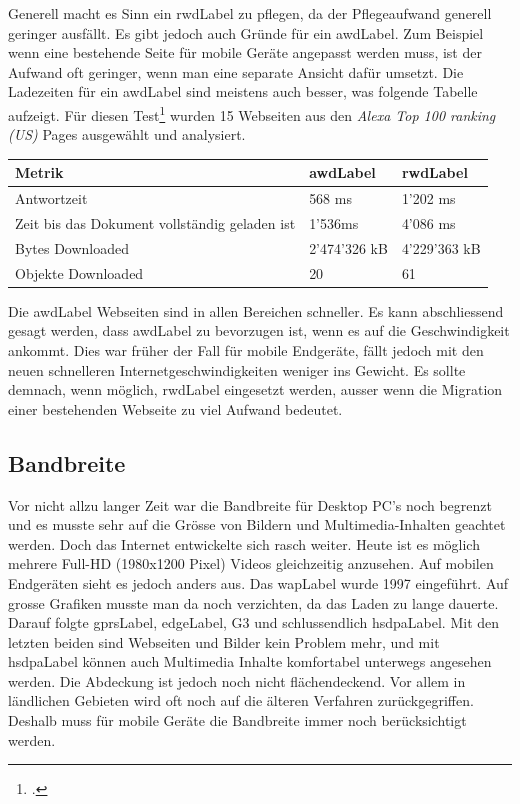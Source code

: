Generell macht es Sinn ein \gls{rwdLabel} zu pflegen, da der Pflegeaufwand generell geringer ausfällt. Es gibt jedoch auch Gründe für ein \gls{awdLabel}. Zum Beispiel wenn eine bestehende Seite für mobile Geräte angepasst werden muss, ist der Aufwand oft geringer, wenn man eine separate Ansicht dafür umsetzt. Die Ladezeiten für ein \gls{awdLabel} sind meistens auch besser, was folgende Tabelle aufzeigt. 
Für diesen Test\footcite{Adaptive_vs_Responsive_Web_Design_Which_Is_Right_for_Your_Site_-_Catchpoints_Blog_2015-06-01} wurden 15 Webseiten aus den \textit{Alexa Top 100 ranking (US)} Pages ausgewählt und analysiert.

\begin{center}
    \begin{tabular}{ | l | l | l |}
    \hline
    Metrik & \gls{awdLabel} & \gls{rwdLabel} \\ \hline
    Antwortzeit & 568 ms & 1'202 ms \\ \hline
    Zeit bis das Dokument vollständig geladen ist & 1'536ms & 4'086 ms \\ \hline
	Bytes Downloaded & 2'474'326 kB & 4'229'363 kB \\ \hline
	Objekte Downloaded & 20 & 61 \\ \hline
    \end{tabular}
\end{center}

Die \gls{awdLabel} Webseiten sind in allen Bereichen schneller. Es kann abschliessend gesagt werden, dass \gls{awdLabel} zu bevorzugen ist, wenn es auf die Geschwindigkeit ankommt. Dies war früher der Fall für mobile Endgeräte, fällt jedoch mit den neuen schnelleren Internetgeschwindigkeiten weniger ins Gewicht. Es sollte demnach, wenn möglich, \gls{rwdLabel} eingesetzt werden, ausser wenn die Migration einer bestehenden Webseite zu viel Aufwand bedeutet.


\subsection{Bandbreite}
\label{sec:requirementsengineerin:endgeraete:bandbreite}
Vor nicht allzu langer Zeit war die Bandbreite für Desktop PC's noch begrenzt und es musste sehr auf die Grösse von Bildern und Multimedia-Inhalten geachtet werden. Doch das Internet entwickelte sich rasch weiter. Heute ist es möglich mehrere Full-HD (1980x1200 Pixel) Videos gleichzeitig anzusehen. Auf mobilen Endgeräten sieht es jedoch anders aus. Das \gls{wapLabel} wurde 1997 eingeführt. Auf grosse Grafiken musste man da noch verzichten, da das Laden zu lange dauerte. Darauf folgte \gls{gprsLabel}, \gls{edgeLabel}, G3 und schlussendlich \gls{hsdpaLabel}. Mit den letzten beiden sind Webseiten und Bilder kein Problem mehr, und mit \gls{hsdpaLabel} können auch Multimedia Inhalte komfortabel unterwegs angesehen werden. Die Abdeckung ist jedoch noch nicht flächendeckend. Vor allem in ländlichen Gebieten wird oft noch auf die älteren Verfahren zurückgegriffen. Deshalb muss für mobile Geräte die Bandbreite immer noch berücksichtigt werden.

